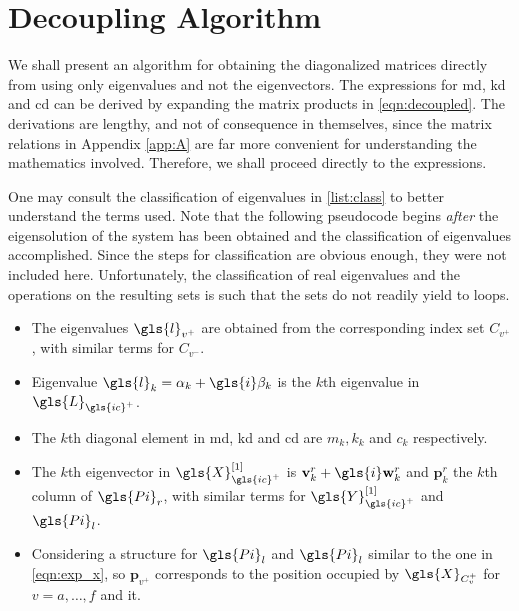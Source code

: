 \chapter{Decoupling Algorithm}
\label{app:2}
We shall present an algorithm for obtaining the diagonalized
matrices directly from using only eigenvalues and not the 
eigenvectors. The expressions for \gls{md}, \gls{kd} and \gls{cd} can be
derived by expanding the matrix products in \eqref{eqn:decoupled}.
The derivations are lengthy, and not of consequence in themselves, 
since the matrix relations in Appendix \autoref{app:A} are far more
convenient for understanding the mathematics involved. Therefore,
we shall proceed directly to the expressions.  

One may consult the classification of eigenvalues in \autoref{list:class} 
to better understand the terms used. Note that the following 
pseudocode begins \emph{after} the eigensolution of the system has been
obtained and the classification of eigenvalues accomplished. Since the
steps for classification are obvious enough, they were not included here. Unfortunately,
the classification of real eigenvalues and the operations on the resulting 
sets is such that the sets do not readily yield to loops. 
\begin{itemize}
\item The eigenvalues $\gls{l}_{v^+}$ are obtained from the corresponding 
index set $C_{v^{+}}$, with similar terms for $C_{v^{-}}$.
\item Eigenvalue $\gls{l}_k = \alpha_k + \gls{i}\beta_k$ is the $k$th 
eigenvalue in $\gls{L}_{\gls{ic}^+}$.
\item The $k$th diagonal element in \gls{md}, \gls{kd} and \gls{cd} are 
$m_k, k_k$ and $c_k$ respectively.
\item The $k$th eigenvector in $\gls{X}_{\gls{ic}^+}^{[1]}$ is
$\mathbf{v}_k^r  + \gls{i}\mathbf{w}_k^r$ and $\mathbf{p}_k^r$ the $k$th column
of $\gls{Pi}_r$, with similar terms for $\gls{Y}_{\gls{ic}^+}^{[1]}$
and $\gls{Pi}_l$.
\item Considering a structure for $\gls{Pi}_l$ and $\gls{Pi}_l$
similar to the one in \eqref{eqn:exp_x}, so $\mathbf{p}_{v^+}$ corresponds
to the position occupied by $\gls{X}_{C_v^+}$ for $v = a,\dots,f$ and \gls{it}.
\end{itemize}
 

